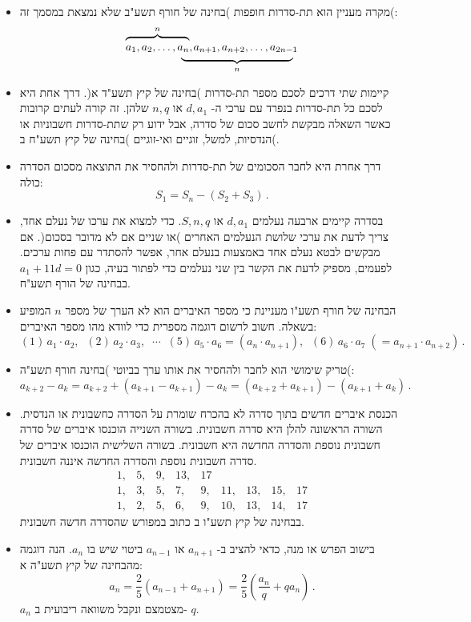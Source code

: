 \begin{itemize}
\item
מקרה מעניין הוא תת-סדרות חופפות )בחינה של חורף תשע"ב שלא נמצאת במסמך זה(:
\[
\renewcommand{\arraystretch}{.4}
\begin{array}{ll}
\overbrace{\rule{0pt}{8pt}a_1, a_2, \ldots, a_n}^{n},&\hspace{-9pt}a_{n+1}, a_{n+2}, \ldots, a_{2n-1}\\
&\hspace{-2em}\underbrace{\rule{10em}{0pt}}_{n}
\end{array}
\]
\vspace{-4ex}
\item
קיימות שתי דרכים לסכם מספר תת-סדרות )בחינה של קיץ תשע"ד א(. דרך אחת היא לסכם כל תת-סדרות בנפרד עם ערכי ה-%
$d, a_1$
או
$n, q$
שלהן. זה קורה לעתים קרובות כאשר השאלה מבקשת לחשב סכום של סדרה, אבל ידוע רק שתת-סדרות חשבוניות או הנדסיות, למשל, זוגיים ואי-זוגיים )בחינה של קיץ תשע"ח ב(.
\item 
דרך אחרת היא לחבר הסכומים של תת-סדרות ולהחסיר את התוצאה מסכום הסדרה כולה:
\[
S_1 = S_n - (S_2+S_3)\,.
\]
\vspace{-6ex}

\item
בסדרה קיימים ארבעה נעלמים
$d, a_1$
או
$S, n, q$.
כדי למצוא את ערכו של נעלם אחד, צריך לדעת את ערכי שלושת הנעלמים האחרים )או שניים אם לא מדובר בסכום(. אם מבקשים לבטא נעלם אחד באמצעות בנעלם אחר, אפשר להסתדר עם פחות ערכים. לפעמים, מספיק לדעת את הקשר בין שני נעלמים כדי לפתור בעיה, כגון
$a_1+11d = 0$
בבחינה של הורף תשע"ח.

\item
הבחינה של חורף תשע"ו מעניינת כי מספר האיברים הוא לא הערך של מספר 
$n$
המופיע בשאלה. חשוב לרשום דוגמה מספרית כדי לוודא מהו מספר האיברים:
\[
(1)\, a_1\cdot a_2,\;\; (2)\,a_2\cdot a_3,\;\;\cdots\;\; (5)\,a_5\cdot a_6=(a_n\cdot a_{n+1}),\;\; (6)\,a_6\cdot a_7 \;(= a_{n+1}\cdot a_{n+2})\,.
\]
\vspace{-4ex}

\item
טריק שימושי הוא לחבר ולהחסיר את אותו ערך בביוטי )בחינה  חורף תשע"ה(:
\[
a_{k+2} - a_{k} = a_{k+2}+(a_{k+1}-a_{k+1})-a_{k} = (a_{k+2}+a_{k+1})-(a_{k+1}+a_{k})\,.
\]
\vspace{-4ex}

\item
הכנסת איברים חדשים בתוך סדרה לא בהכרח שומרת על הסדרה כחשבונית או הנדסית. השורה הראשונה להלן היא סדרה חשבונית. בשורה השנייה הוכנסו איברים של סדרה חשבונית נוספת והסדרה החדשה היא חשבונית. בשורה השלישית הוכנסו איברים של סדרה חשבונית נוספת והסדרה החדשה איננה חשבונית.
\[
\begin{array}{rrrrrrrrrrrrr}
1,& 5,& 9,& 13,& 17\\
1, &3,& 5,&7,& 9,& 11,& 13, &15, & 17\\
1, &2,& 5,&6,& 9,& 10,& 13, &14, & 17
\end{array}
\]
בבחינה של קיץ תשע"ו ב כתוב במפורש שהסדרה חדשה חשבונית.

\item
בישוב הפרש או מנה, כדאי להציב ב-%
$a_{n+1}$
או
$a_{n-1}$
ביטוי שיש בו 
$a_n$.
הנה דוגמה מהבחינה של  קיץ תשע"ה א:
\[
a_n = \frac{2}{5}(a_{n-1}+a_{n+1}) =\frac{2}{5}\left(\frac{a_n}{q}+qa_n\right)\,.
\]
$a_n$
מצטמצם ונקבל משוואה ריבועית ב-%
$q$.

\end{itemize}

